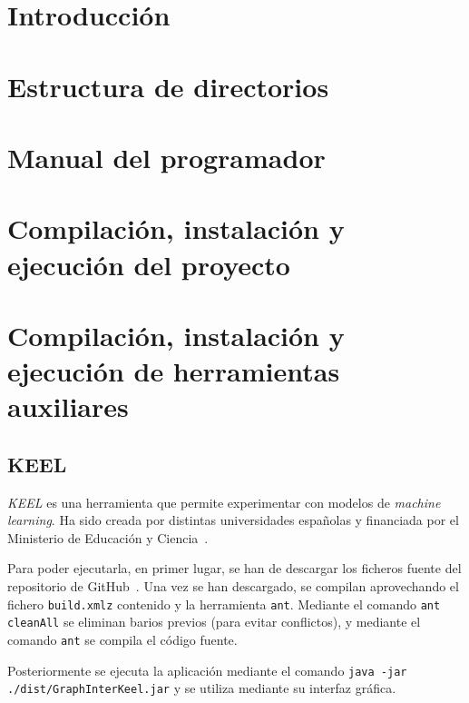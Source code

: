 
\section{Introducción}

\section{Estructura de directorios}

\section{Manual del programador}

\section{Compilación, instalación y ejecución del proyecto}

\section{Compilación, instalación y ejecución de herramientas auxiliares}

\subsection{KEEL}

\textit{KEEL} es una herramienta que permite experimentar con modelos de \textit{machine learning}. Ha sido creada por distintas universidades españolas y financiada por el Ministerio de Educación y Ciencia~\cite{KEEL}.

Para poder ejecutarla, en primer lugar, se han de descargar los ficheros fuente del repositorio de GitHub~\cite{keelRepo}. Una vez se han descargado, se compilan aprovechando el fichero \texttt{build.xmlz} contenido y la herramienta \texttt{ant}. Mediante el comando \texttt{ant cleanAll} se eliminan barios previos (para evitar conflictos), y mediante el comando \texttt{ant} se compila el código fuente.

Posteriormente se ejecuta la aplicación mediante el comando \texttt{java -jar ./dist/GraphInterKeel.jar} y se utiliza mediante su interfaz gráfica.

